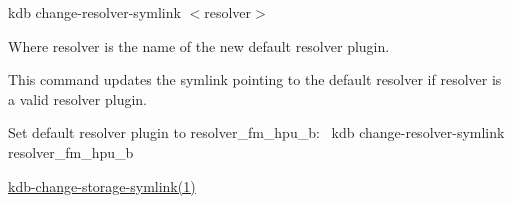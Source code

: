 {\ttfamily kdb change-\/resolver-\/symlink $<$resolver$>$}

Where {\ttfamily resolver} is the name of the new default resolver plugin.

This command updates the symlink pointing to the default resolver if {\ttfamily resolver} is a valid resolver plugin.

Set default resolver plugin to resolver\+\_\+fm\+\_\+hpu\+\_\+b\+:~\newline
 {\ttfamily kdb change-\/resolver-\/symlink resolver\+\_\+fm\+\_\+hpu\+\_\+b}


\begin{DoxyItemize}
\item \mbox{\hyperlink{doc_help_kdb-change-storage-symlink_md}{kdb-\/change-\/storage-\/symlink(1)}} 
\end{DoxyItemize}